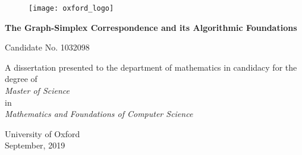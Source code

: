 \begin{titlepage}
	\vspace*{2cm}
	\begin{figure}
		\centering 
		\texttt{[image: oxford\_logo]}
	\end{figure}
	
	\begin{center}
		\begin{adjustwidth}{7em}{7em}
			\centering 
					{\bf \large The Graph-Simplex Correspondence and its Algorithmic Foundations}\\
			\end{adjustwidth}
		\vspace{4cm}
		Candidate No. 1032098\\
		\vspace{1.5cm}
		\begin{adjustwidth}{9em}{9em}
			\centering 
					A dissertation presented to  the department of mathematics in candidacy for the degree of \\
					\emph{Master of Science} \\
					in \\
					\emph{Mathematics and Foundations of Computer Science}
			\end{adjustwidth}
		\vspace{1.5cm}
		University of  Oxford\\
		September, 2019
	\end{center}
\end{titlepage}